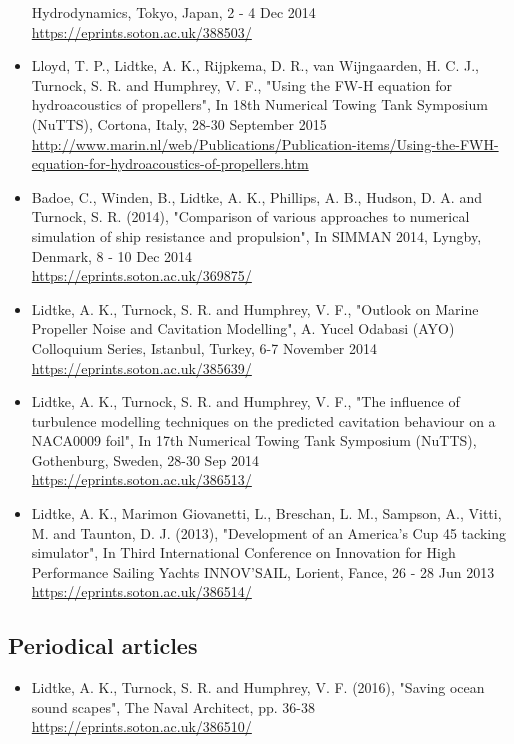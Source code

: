 \documentclass[a4paper,10pt]{article}
\begin{document}
\begin{itemize}
	Hydrodynamics, Tokyo, Japan, 2 - 4 Dec 2014
	\cite{Lidtke2015b}
	\\ \url{https://eprints.soton.ac.uk/388503/}
%
\item Lloyd, T. P., Lidtke, A. K., Rijpkema, D. R., van Wijngaarden, H. C. J.,
	Turnock, S. R. and Humphrey, V. F., "Using the FW-H equation for hydroacoustics
	of propellers", In 18th Numerical Towing Tank Symposium (NuTTS), Cortona, Italy, 28-30 September 2015
	\cite{Lloyd2015a}
	\\ \url{http://www.marin.nl/web/Publications/Publication-items/Using-the-FWH-equation-for-hydroacoustics-of-propellers.htm}
%
\item Badoe, C., Winden, B., Lidtke, A. K., Phillips, A. B., Hudson, D. A. and
	Turnock, S. R. (2014), "Comparison of various approaches to numerical simulation
	of ship resistance and propulsion", In SIMMAN 2014, Lyngby, Denmark, 8 - 10 Dec 2014
	\cite{Badoe2014}
	\\ \url{https://eprints.soton.ac.uk/369875/}
%
\item Lidtke, A. K., Turnock, S. R. and Humphrey, V. F., "Outlook on Marine Propeller
	Noise and Cavitation Modelling", A. Yucel Odabasi (AYO) Colloquium Series, Istanbul,
	Turkey, 6-7 November 2014
	\cite{Lidtke2014a}
	\\ \url{https://eprints.soton.ac.uk/385639/}
%
\item Lidtke, A. K., Turnock, S. R. and Humphrey, V. F., "The influence of turbulence
	modelling techniques on the predicted cavitation behaviour on a NACA0009 foil",
	In 17th Numerical Towing Tank Symposium (NuTTS), Gothenburg, Sweden, 28-30 Sep 2014
	\cite{Lidtke2014}
	\\ \url{https://eprints.soton.ac.uk/386513/}
%
\item Lidtke, A. K., Marimon Giovanetti, L., Breschan, L. M., Sampson, A., Vitti, M.
	and Taunton, D. J. (2013), "Development of an America's Cup 45 tacking simulator",
	In Third International Conference on Innovation for High Performance Sailing
	Yachts INNOV’SAIL, Lorient, Fance, 26 - 28 Jun 2013
	\cite{Lidtke2013}
	\\ \url{https://eprints.soton.ac.uk/386514/}
%
\end{itemize}

\subsection{Periodical articles}
%
\begin{itemize}
\item Lidtke, A. K., Turnock, S. R. and Humphrey, V. F. (2016), "Saving ocean sound
	scapes", The Naval Architect, pp. 36-38
	\cite{Lidtke2016c}
	\\ \url{https://eprints.soton.ac.uk/386510/}
%
\end{itemize}
\end{document}
